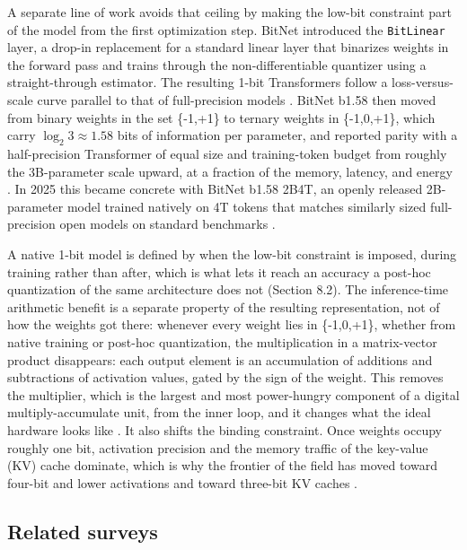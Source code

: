 \documentclass[11pt]{article}
\begin{document}
A separate line of work avoids that ceiling by making the low-bit constraint part of
the model from the first optimization step. BitNet introduced the \texttt{BitLinear} layer, a
drop-in replacement for a standard linear layer that binarizes weights in the forward
pass and trains through the non-differentiable quantizer using a straight-through
estimator. The resulting 1-bit Transformers follow a loss-versus-scale curve parallel
to that of full-precision models \cite{Wang2023-BitNet,Wang2025-BitNetJMLR}. BitNet b1.58
then moved from binary weights in the set \{-1,+1\} to ternary weights in \{-1,0,+1\},
which carry $\log_2 3 \approx 1.58$ bits of information per parameter, and reported
parity with a half-precision Transformer of equal size and training-token budget from
roughly the 3B-parameter scale upward, at a fraction of the memory, latency, and energy
\cite{Ma2024-BitNetB158}. In 2025 this became concrete with BitNet b1.58 2B4T, an openly
released 2B-parameter model trained natively on 4T tokens that matches similarly sized
full-precision open models on standard benchmarks \cite{Ma2025-BitNet2B4T}.

A native 1-bit model is defined by when the low-bit constraint is imposed, during
training rather than after, which is what lets it reach an accuracy a post-hoc
quantization of the same architecture does not (Section 8.2). The inference-time
arithmetic benefit is a separate property of the resulting representation, not of how
the weights got there: whenever every weight lies in \{-1,0,+1\}, whether from native
training or post-hoc quantization, the multiplication in a matrix-vector
product disappears: each output element is an accumulation of additions and
subtractions of activation values, gated by the sign of the weight. This removes the
multiplier, which is the largest and most power-hungry component of a digital
multiply-accumulate unit, from the inner loop, and it changes what the ideal hardware
looks like \cite{Malekar2024-MatmulOrNot,Zhu2024-MatmulFree}. It also shifts the binding
constraint. Once weights occupy roughly one bit, activation precision and the memory
traffic of the key-value (KV) cache dominate, which is why the frontier of the field
has moved toward four-bit and lower activations and toward three-bit KV caches
\cite{Wang2024-BitNetA48,Wang2025-BitNetV2}.

\subsection{Related surveys}
\end{document}
